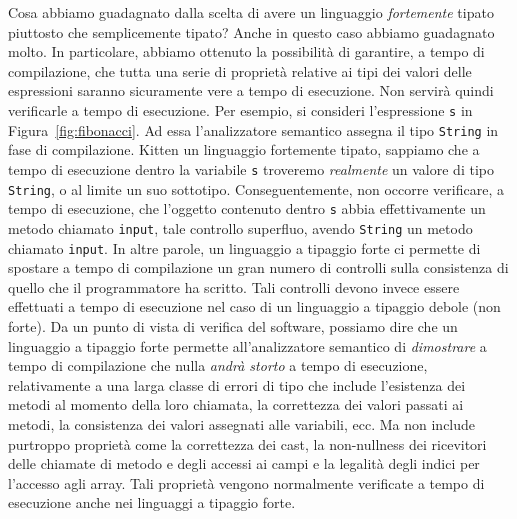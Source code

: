 Cosa abbiamo guadagnato dalla scelta di avere un linguaggio
\emph{fortemente} tipato piuttosto che semplicemente tipato? Anche in questo
caso abbiamo guadagnato molto. In particolare, abbiamo ottenuto la
possibilit\`a di garantire, a tempo di compilazione, che tutta una serie
di propriet\`a relative ai tipi dei valori delle espressioni saranno
sicuramente vere a tempo di esecuzione. Non servir\`a quindi verificarle
a tempo di esecuzione. Per esempio, si consideri l'espressione
\texttt{s} in Figura~\ref{fig:fibonacci}. Ad essa l'analizzatore
semantico assegna il tipo \texttt{String} in fase di compilazione.
\Poiche Kitten \e un linguaggio fortemente tipato,
sappiamo che a tempo di esecuzione dentro la variabile \texttt{s} troveremo
\emph{realmente}
un valore di tipo \texttt{String}, o al limite un suo sottotipo.
Conseguentemente, non occorre verificare,
a tempo di esecuzione, che l'oggetto contenuto dentro \texttt{s} abbia
effettivamente un metodo chiamato \texttt{input}, \perche tale controllo
\e superfluo, avendo \texttt{String} un metodo chiamato \texttt{input}.
In altre parole, un linguaggio a tipaggio forte ci permette di spostare
a tempo di compilazione un gran numero di controlli sulla consistenza
di quello che il programmatore ha scritto. Tali controlli devono invece
essere effettuati a tempo di esecuzione nel caso di un linguaggio a
tipaggio debole (\cioe non forte). Da un punto di vista di verifica del
software, possiamo dire che un linguaggio a tipaggio forte permette
all'analizzatore semantico di \emph{dimostrare} a tempo di compilazione
che nulla \emph{andr\`a storto}
a tempo di esecuzione, relativamente a una larga
classe di errori di tipo che include l'esistenza dei metodi al momento
della loro chiamata, la correttezza dei valori passati ai metodi,
la consistenza dei valori assegnati alle variabili, ecc. Ma non include
purtroppo
propriet\`a come la correttezza dei cast, la non-nullness dei ricevitori
delle chiamate di metodo e degli accessi ai campi e la legalit\`a
degli indici per l'accesso agli array. Tali propriet\`a
vengono normalmente verificate a tempo di esecuzione anche nei linguaggi
a tipaggio forte.

